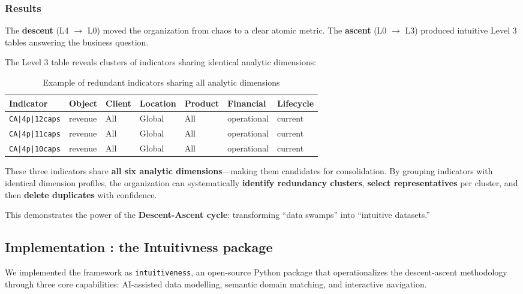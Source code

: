 \documentclass[Afour,times,sageh]{sagej}
\begin{document}
\subsubsection{Results}

The \textbf{descent} (L4 $\to$ L0) moved the organization from chaos to a clear atomic metric. The \textbf{ascent} (L0 $\to$ L3) produced intuitive Level 3 tables answering the business question.

The Level 3 table reveals clusters of indicators sharing identical analytic dimensions:

\begin{table}[h]
\centering
\small
\begin{tabular}{@{}lllllll@{}}
\toprule
\textbf{Indicator} & \textbf{Object} & \textbf{Client} & \textbf{Location} & \textbf{Product} & \textbf{Financial} & \textbf{Lifecycle} \\ \midrule
\texttt{CA|4p|12caps} & revenue & All & Global & All & operational & current \\
\texttt{CA|4p|11caps} & revenue & All & Global & All & operational & current \\
\texttt{CA|4p|10caps} & revenue & All & Global & All & operational & current \\ \bottomrule
\end{tabular}
\caption{Example of redundant indicators sharing all analytic dimensions}
\end{table}

These three indicators share \textbf{all six analytic dimensions}---making them candidates for consolidation. By grouping indicators with identical dimension profiles, the organization can systematically \textbf{identify redundancy clusters}, \textbf{select representatives} per cluster, and then \textbf{delete duplicates} with confidence.

This demonstrates the power of the \textbf{Descent-Ascent cycle}: transforming ``data swamps'' into ``intuitive datasets.''

\subsection{Implementation : the Intuitivness package}


We implemented the framework as \texttt{intuitiveness}, an open-source Python package that operationalizes the descent-ascent methodology through three core capabilities: AI-assisted data modelling, semantic domain matching, and interactive navigation.
\end{document}
